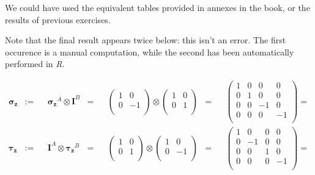 \documentclass[solutions.tex]{subfiles}
\begin{document}
\begin{remark} We could have used the equivalent tables provided
in annexes in the book, or the results of previous exercises.
\end{remark}

\begin{remark} Note that the final result appears twice below: this
isn't an error. The first occurence is a manual computation, while the
second has been automatically performed in \textit{R}.
\end{remark}

\begin{equation*}\begin{aligned}
	\bm{\sigma_z} &:=&& \bm{\sigma_z}^A\otimes\bm{I}^B &=&&
	\begin{pmatrix}
		1 & 0 \\
		0 & -1 \\
	\end{pmatrix}\otimes\begin{pmatrix}
		1 & 0 \\
		0 & 1 \\
	\end{pmatrix} &=&& \begin{pmatrix}
		1 & 0 & 0  & 0  \\
		0 & 1 & 0  & 0  \\
		0 & 0 & -1 & 0  \\
		0 & 0 & 0  & -1 \\
	\end{pmatrix} =  \\
	\bm{\tau_z} &:=&& \bm{I}^A\otimes\bm{\tau_z}^B &=&&
	\begin{pmatrix}
		1 & 0 \\
		0 & 1 \\
	\end{pmatrix}\otimes\begin{pmatrix}
		1 & 0 \\
		0 & -1 \\
	\end{pmatrix} &=&& \begin{pmatrix}
		1 & 0  & 0 & 0  \\
		0 & -1 & 0 & 0  \\
		0 & 0  & 1 & 0  \\
		0 & 0  & 0 & -1 \\
	\end{pmatrix} =  \\
\end{aligned}\end{equation*}
\end{document}

